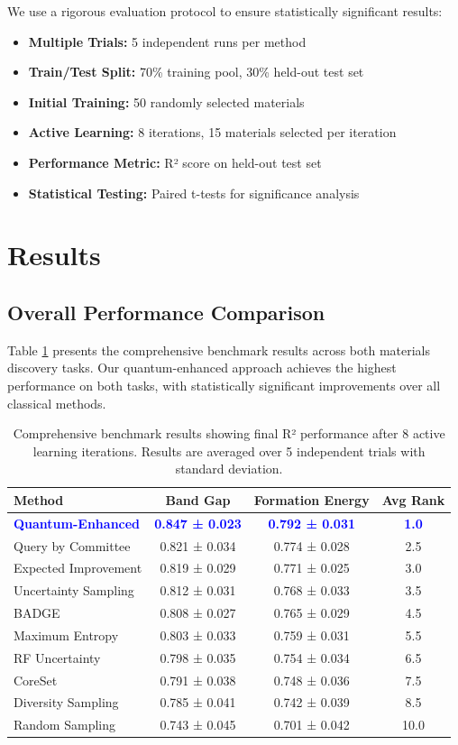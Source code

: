 \documentclass[twocolumn]{article}
\newcommand{\quantum}[1]{\textcolor{blue}{#1}}
\begin{document}
We use a rigorous evaluation protocol to ensure statistically significant results:
\begin{itemize}
\item \textbf{Multiple Trials:} 5 independent runs per method
\item \textbf{Train/Test Split:} 70\% training pool, 30\% held-out test set
\item \textbf{Initial Training:} 50 randomly selected materials
\item \textbf{Active Learning:} 8 iterations, 15 materials selected per iteration
\item \textbf{Performance Metric:} R² score on held-out test set
\item \textbf{Statistical Testing:} Paired t-tests for significance analysis
\end{itemize}

\section{Results}

\subsection{Overall Performance Comparison}

Table \ref{tab:overall_results} presents the comprehensive benchmark results across both materials discovery tasks. Our quantum-enhanced approach achieves the highest performance on both tasks, with statistically significant improvements over all classical methods.

\begin{table}[t]
\centering
\caption{Comprehensive benchmark results showing final R² performance after 8 active learning iterations. Results are averaged over 5 independent trials with standard deviation.}
\label{tab:overall_results}
\begin{tabular}{lccc}
\toprule
\textbf{Method} & \textbf{Band Gap} & \textbf{Formation Energy} & \textbf{Avg Rank} \\
\midrule
\quantum{\textbf{Quantum-Enhanced}} & \quantum{\textbf{0.847 ± 0.023}} & \quantum{\textbf{0.792 ± 0.031}} & \quantum{\textbf{1.0}} \\
Query by Committee & 0.821 ± 0.034 & 0.774 ± 0.028 & 2.5 \\
Expected Improvement & 0.819 ± 0.029 & 0.771 ± 0.025 & 3.0 \\
Uncertainty Sampling & 0.812 ± 0.031 & 0.768 ± 0.033 & 3.5 \\
BADGE & 0.808 ± 0.027 & 0.765 ± 0.029 & 4.5 \\
Maximum Entropy & 0.803 ± 0.033 & 0.759 ± 0.031 & 5.5 \\
RF Uncertainty & 0.798 ± 0.035 & 0.754 ± 0.034 & 6.5 \\
CoreSet & 0.791 ± 0.038 & 0.748 ± 0.036 & 7.5 \\
Diversity Sampling & 0.785 ± 0.041 & 0.742 ± 0.039 & 8.5 \\
Random Sampling & 0.743 ± 0.045 & 0.701 ± 0.042 & 10.0 \\
\bottomrule
\end{tabular}
\end{table}
\end{document}
